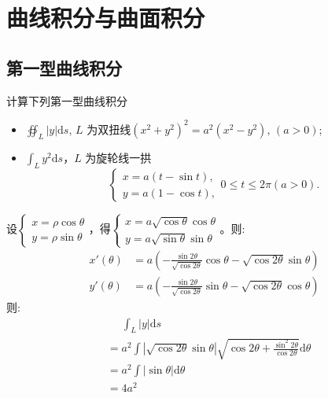 \chapter{曲线积分与曲面积分}
\section{第一型曲线积分}
\begin{problem}
    计算下列第一型曲线积分
    \begin{itemize}
        \item \(\displaystyle\oiint_{L}|y|\mathrm{d}s\), \(L\)
            为双扭线\((x^2 + y^2)^2 = a^2
            (x^2 - y^2)\), \((a > 0)\);
        \item \(\int_{L} y^2 \mathrm{d}s\)，\(L\) 为旋轮线一拱
            \[
                \begin{cases}
                    x = a(t - \sin t), \\
                    y = a(1 - \cos t),
                \end{cases}  0 \leq t \leq 2\pi (a > 0).
            \]
    \end{itemize}

\end{problem}

\begin{solution}
    设\(
        \begin{cases}
            x = \rho \cos \theta \\
            y = \rho \sin \theta
    \end{cases}\)，得\(
        \begin{cases}
            x = a \sqrt{\cos \theta}\cos \theta \\
            y = a \sqrt{\sin \theta}\sin \theta
    \end{cases}\)。则:
    \begin{align*}
        x'(\theta) &= a \left( - \frac{\sin 2\theta}{\sqrt{\cos
        2\theta}} \cos\theta - \sqrt{\cos2\theta} \sin\theta \right)\\
        y'(\theta) &= a \left( - \frac{\sin 2\theta}{\sqrt{\cos
        2\theta}} \sin\theta - \sqrt{\cos2\theta} \cos\theta \right)
    \end{align*}
    则:
    \begin{align*}
        &\mathrel{\phantom{=}} \int_{L} \left| y \right|
        \mathrm{d}s \\
        &= a^{2} \int \left| \sqrt{\cos2\theta}\sin\theta
        \right|\sqrt{\cos2\theta +
        \frac{\sin^{2}2\theta}{\cos2\theta}} \mathrm{d}\theta \\
        &= a^{2}\int \left| \sin\theta \right|  \mathrm{d}\theta \\
        &= 4a^{2}
    \end{align*}
\end{solution}

